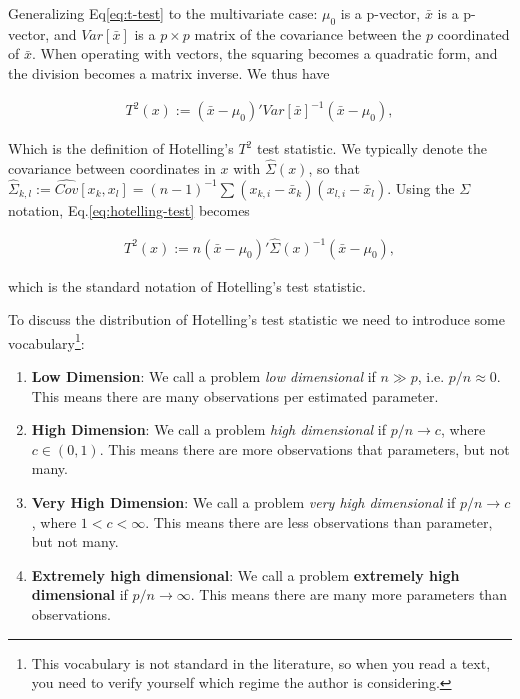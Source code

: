 \documentclass[]{book}
\providecommand{\tightlist}{%
  \setlength{\itemsep}{0pt}\setlength{\parskip}{0pt}}
\theoremstyle{definition}
\theoremstyle{definition}
\theoremstyle{remark}
\begin{document}
Generalizing Eq\eqref{eq:t-test} to the multivariate case: \(\mu_0\) is a
p-vector, \(\bar x\) is a p-vector, and \(Var[\bar x]\) is a
\(p \times p\) matrix of the covariance between the \(p\) coordinated of
\(\bar x\). When operating with vectors, the squaring becomes a
quadratic form, and the division becomes a matrix inverse. We thus have

\begin{align}
  T^2(x):= (\bar{x}-\mu_0)' Var[\bar{x}]^{-1} (\bar{x}-\mu_0),
  \label{eq:hotelling-test}
\end{align}

Which is the definition of Hotelling's \(T^2\) test statistic. We
typically denote the covariance between coordinates in \(x\) with
\(\hat \Sigma(x)\), so that
\(\widehat \Sigma_{k,l}:=\widehat {Cov}[x_k,x_l]=(n-1)^{-1} \sum (x_{k,i}-\bar x_k)(x_{l,i}-\bar x_l)\).
Using the \(\Sigma\) notation, Eq.\eqref{eq:hotelling-test} becomes

\begin{align}
  T^2(x):= n (\bar{x}-\mu_0)' \hat \Sigma(x)^{-1} (\bar{x}-\mu_0),
\end{align}

which is the standard notation of Hotelling's test statistic.

To discuss the distribution of Hotelling's test statistic we need to
introduce some vocabulary\footnote{This vocabulary is not standard in
  the literature, so when you read a text, you need to verify yourself
  which regime the author is considering.}:

\begin{enumerate}
\def\labelenumi{\arabic{enumi}.}
\tightlist
\item
  \textbf{Low Dimension}: We call a problem \emph{low dimensional} if
  \(n \gg p\), i.e. \(p/n \approx 0\). This means there are many
  observations per estimated parameter.
\item
  \textbf{High Dimension}: We call a problem \emph{high dimensional} if
  \(p/n \to c\), where \(c\in (0,1)\). This means there are more
  observations that parameters, but not many.
\item
  \textbf{Very High Dimension}: We call a problem \emph{very high
  dimensional} if \(p/n \to c\), where \(1<c<\infty\). This means there
  are less observations than parameter, but not many.
\item
  \textbf{Extremely high dimensional}: We call a problem
  \textbf{extremely high dimensional} if \(p/n \to \infty\). This means
  there are many more parameters than observations.
\end{enumerate}
\end{document}
